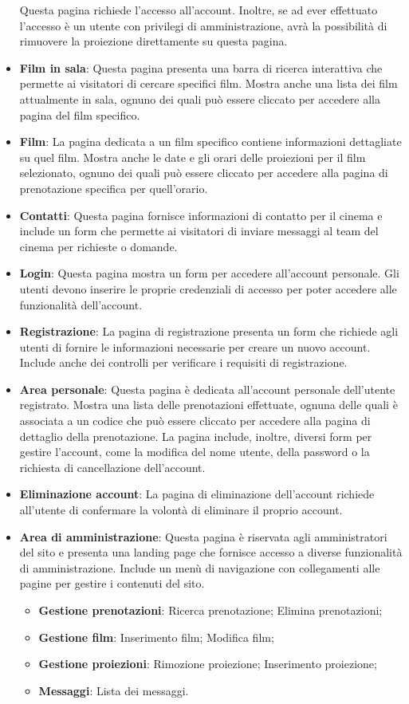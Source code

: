 \begin{itemize}
    Questa pagina richiede l'accesso all'account. Inoltre, se ad ever effettuato l'accesso è un utente con privilegi di amministrazione, avrà la possibilità di rimuovere la proiezione direttamente su questa pagina.
    \item \textbf{Film in sala}:
    Questa pagina presenta una barra di ricerca interattiva che permette ai visitatori di cercare specifici film. Mostra anche una lista dei film attualmente in sala, ognuno dei quali può essere cliccato per accedere alla pagina del film specifico.
    \item \textbf{Film}:
    La pagina dedicata a un film specifico contiene informazioni dettagliate su quel film. Mostra anche le date e gli orari delle proiezioni per il film selezionato, ognuno dei quali può essere cliccato per accedere alla pagina di prenotazione specifica per quell'orario.
    \item \textbf{Contatti}:
    Questa pagina fornisce informazioni di contatto per il cinema e include un form che permette ai visitatori di inviare messaggi al team del cinema per richieste o domande.
    \item \textbf{Login}:
    Questa pagina mostra un form per accedere all'account personale. Gli utenti devono inserire le proprie credenziali di accesso per poter accedere alle funzionalità dell'account.
    \item \textbf{Registrazione}:
    La pagina di registrazione presenta un form che richiede agli utenti di fornire le informazioni necessarie per creare un nuovo account. Include anche dei controlli per verificare i requisiti di registrazione.
    \item \textbf{Area personale}:
    Questa pagina è dedicata all'account personale dell'utente registrato. Mostra una lista delle prenotazioni effettuate, ognuna delle quali è associata a un codice che può essere cliccato per accedere alla pagina di dettaglio della prenotazione. La pagina include, inoltre, diversi form per gestire l'account, come la modifica del nome utente, della password o la richiesta di cancellazione dell'account.
    \item \textbf{Eliminazione account}:
    La pagina di eliminazione dell'account richiede all'utente di confermare la volontà di eliminare il proprio account.
    \item \textbf{Area di amministrazione}:
    Questa pagina è riservata agli amministratori del sito e presenta una landing page che fornisce accesso a diverse funzionalità di amministrazione. Include un menù di navigazione con collegamenti alle pagine per gestire i contenuti del sito.
    \begin{itemize}
        \item \textbf{Gestione prenotazioni}: Ricerca prenotazione; Elimina prenotazioni;
        \item \textbf{Gestione film}: Inserimento film; Modifica film;
        \item \textbf{Gestione proiezioni}: Rimozione proiezione; Inserimento proiezione;
        \item \textbf{Messaggi}: Lista dei messaggi.
    \end{itemize}
\end{itemize}

